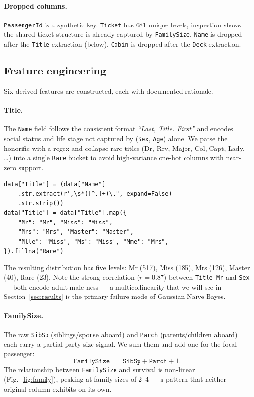 \documentclass[10pt,a4paper,twocolumn]{article}
\begin{document}
\paragraph{Dropped columns.} \texttt{PassengerId} is a synthetic key.
\texttt{Ticket} has 681 unique levels; inspection shows the shared-ticket structure
is already captured by \texttt{FamilySize}. \texttt{Name} is dropped after the
\texttt{Title} extraction (below). \texttt{Cabin} is dropped after the
\texttt{Deck} extraction.

\subsection{Feature engineering}
Six derived features are constructed, each with documented rationale.

\paragraph{Title.} The \texttt{Name} field follows the consistent format
\textit{``Last, Title. First''} and encodes social status and life stage not
captured by (\texttt{Sex}, \texttt{Age}) alone. We parse the honorific with a
regex and collapse rare titles (Dr, Rev, Major, Col, Capt, Lady, \ldots) into a
single \texttt{Rare} bucket to avoid high-variance one-hot columns with near-zero
support.

\begin{lstlisting}[caption={Title extraction and rare-category collapsing.},label={lst:title}]
data["Title"] = (data["Name"]
    .str.extract(r",\s*([^.]+)\.", expand=False)
    .str.strip())
data["Title"] = data["Title"].map({
    "Mr": "Mr", "Miss": "Miss",
    "Mrs": "Mrs", "Master": "Master",
    "Mlle": "Miss", "Ms": "Miss", "Mme": "Mrs",
}).fillna("Rare")
\end{lstlisting}

The resulting distribution has five levels: Mr (517), Miss (185), Mrs (126), Master
(40), Rare (23). Note the strong correlation ($r = 0.87$) between \texttt{Title\_Mr}
and \texttt{Sex} --- both encode adult-male-ness --- a multicollinearity that we will
see in Section~\ref{sec:results} is the primary failure mode of Gaussian Na\"ive Bayes.

\paragraph{FamilySize.} The raw \texttt{SibSp} (siblings/spouse aboard) and
\texttt{Parch} (parents/children aboard) each carry a partial party-size signal. We
sum them and add one for the focal passenger:
\[
\texttt{FamilySize} \;=\; \texttt{SibSp} + \texttt{Parch} + 1 .
\]
The relationship between \texttt{FamilySize} and survival is non-linear
(Fig.~\ref{fig:family}), peaking at family sizes of 2--4 --- a pattern that neither
original column exhibits on its own.
\end{document}
